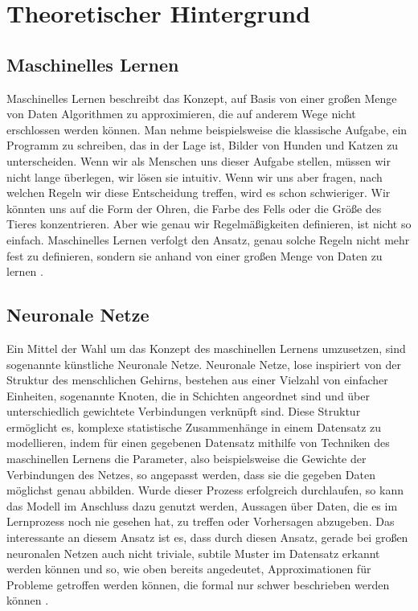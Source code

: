 \section{Theoretischer Hintergrund}
\subsection{Maschinelles Lernen}
Maschinelles Lernen beschreibt das Konzept, auf Basis von einer großen Menge von Daten Algorithmen zu approximieren, die auf anderem Wege nicht erschlossen werden können. Man nehme beispielsweise die klassische Aufgabe, ein Programm zu schreiben, das in der Lage ist, Bilder von Hunden und Katzen zu unterscheiden. Wenn wir als Menschen uns dieser Aufgabe stellen, müssen wir nicht lange überlegen, wir lösen sie intuitiv. Wenn wir uns aber fragen, nach welchen Regeln wir diese Entscheidung treffen, wird es schon schwieriger. Wir könnten uns auf die Form der Ohren, die Farbe des Fells oder die Größe des Tieres konzentrieren. Aber wie genau wir Regelmäßigkeiten definieren, ist nicht so einfach. Maschinelles Lernen verfolgt den Ansatz, genau solche Regeln nicht mehr fest zu definieren, sondern sie anhand von einer großen Menge von Daten zu lernen \parencite[Vgl.][S. 2f.]{bishop_2006}.

\subsection{Neuronale Netze}
Ein Mittel der Wahl um das Konzept des maschinellen Lernens umzusetzen, sind sogenannte künstliche Neuronale Netze. Neuronale Netze, lose inspiriert von der Struktur des menschlichen Gehirns, bestehen aus einer Vielzahl von einfacher Einheiten, sogenannte Knoten, die in Schichten angeordnet sind und über unterschiedlich gewichtete Verbindungen verknüpft sind. Diese Struktur ermöglicht es, komplexe statistische Zusammenhänge in einem Datensatz zu modellieren, indem für einen gegebenen Datensatz mithilfe von Techniken des maschinellen Lernens die Parameter, also beispielsweise die Gewichte der Verbindungen des Netzes, so angepasst werden, dass sie die gegeben Daten möglichst genau abbilden. Wurde dieser Prozess erfolgreich durchlaufen, so kann das Modell im Anschluss dazu genutzt werden, Aussagen über Daten, die es im Lernprozess noch nie gesehen hat, zu treffen oder Vorhersagen abzugeben. Das interessante an diesem Ansatz ist es, dass durch diesen Ansatz, gerade bei großen neuronalen Netzen auch nicht triviale, subtile Muster im Datensatz erkannt werden können und so, wie oben bereits angedeutet, Approximationen für Probleme getroffen werden können, die formal nur schwer beschrieben werden können \parencite[Vgl.][S. 225f.]{bishop_2006}.

